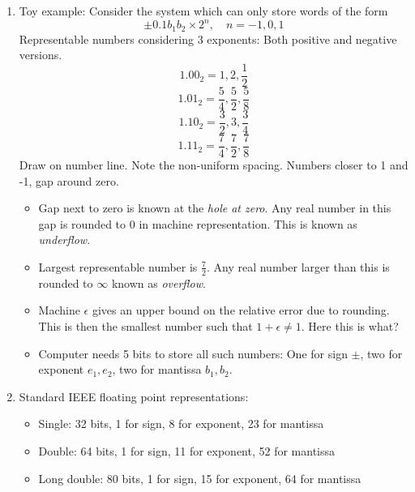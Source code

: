 \documentclass{article}
\theoremstyle{remark}
\begin{document}
\begin{enumerate}
\begin{enumerate}
\item Toy example: Consider the system which can only store words of the form
\[
\pm 0.1b_1b_2 \times 2^n, \quad n=-1,0,1
\]
Representable numbers considering 3 exponents: Both positive and negative versions.
\[
1.00_2 = 1, 2, \frac{1}{2}
\]
\[
1.01_2 = \frac{5}{4}, \frac{5}{2}, \frac{5}{8}
\]
\[
1.10_2 = \frac{3}{2}, 3, \frac{3}{4}
\]
\[
1.11_2 = \frac{7}{4}, \frac{7}{2}, \frac{7}{8}
\]
Draw on number line. Note the non-uniform spacing. Numbers closer to 1 and -1, gap around zero. 
\begin{itemize}
\item Gap next to zero is known at the \emph{hole at zero}. Any real number in this gap is rounded to 0 in machine representation. This is known as \emph{underflow}.
\item Largest representable number is $\frac{7}{2}$. Any real number larger than this is rounded to $\infty$ known as \emph{overflow}.
\item Machine $\epsilon$ gives an upper bound on the relative error due to rounding. This is then the smallest number such that $1 + \epsilon \neq 1$. Here this is what?
\item Computer needs 5 bits to store all such numbers: One for sign $\pm$, two for exponent $e_1, e_2$, two for mantissa $b_1,b_2$. 
\end{itemize}
\item Standard IEEE floating point representations:
\begin{itemize}
\item Single: 32 bits, 1 for sign, 8 for exponent, 23 for mantissa
\item Double:  64 bits, 1 for sign, 11 for exponent, 52 for mantissa
\item Long double:  80 bits, 1 for sign, 15 for exponent, 64 for mantissa
\end{itemize}
\end{enumerate}


\end{enumerate}
\end{document}
